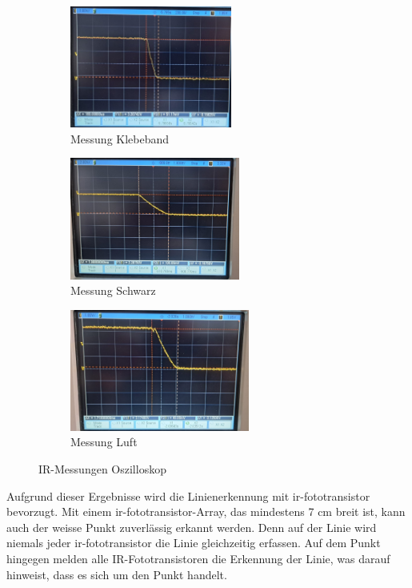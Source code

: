 \documentclass[../main.tex]{subfiles}
\begin{document}
\begin{figure}[htbp]
    \raggedright
    \begin{subfigure}[b]{0.3\textwidth}
        \includegraphics[height=4cm]{img/sensortest/IR_Klebeband.jpg}
        \caption{Messung Klebeband}
        \label{fig:IR_Klebeband}
    \end{subfigure}
    \hspace{0.2cm}  %
    \begin{subfigure}[b]{0.3\textwidth}
        \includegraphics[height=4cm]{img/sensortest/IR_Schwarz.jpg}
        \caption{Messung Schwarz}
        \label{fig:IR_Schwarz}
    \end{subfigure}
    \hspace{0.5cm}  %
    \begin{subfigure}[b]{0.3\textwidth}
        \includegraphics[height=4cm]{img/sensortest/IR_Luft.jpg}
        \caption{Messung Luft}
        \label{fig:IR_Luft}
    \end{subfigure}
    \caption{IR-Messungen Oszilloskop}
    \label{fig:IR_Messungen}
\end{figure}

Aufgrund dieser Ergebnisse wird die Linienerkennung mit \gls{ir-fototransistor} bevorzugt. Mit einem \gls{ir-fototransistor}-Array, das mindestens 7 cm breit ist, kann auch der weisse Punkt zuverlässig erkannt werden. Denn auf der Linie wird niemals jeder \gls{ir-fototransistor} die Linie gleichzeitig erfassen. Auf dem Punkt hingegen melden alle IR-Fototransistoren die Erkennung der Linie, was darauf hinweist, dass es sich um den Punkt handelt.
\end{document}
